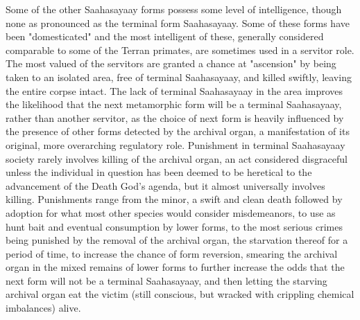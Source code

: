 Some of the other Saahasayaay forms possess some level of
intelligence, though none as pronounced as the terminal form
Saahasayaay. Some of these forms have been "domesticated" and the most
intelligent of these, generally considered comparable to some of the
Terran primates, are sometimes used in a servitor role. The most
valued of the servitors are granted a chance at "ascension" by being
taken to an isolated area, free of terminal Saahasayaay, and killed
swiftly, leaving the entire corpse intact. The lack of terminal
Saahasayaay in the area improves the likelihood that the next
metamorphic form will be a terminal Saahasayaay, rather than another
servitor, as the choice of next form is heavily influenced by the
presence of other forms detected by the archival organ, a
manifestation of its original, more overarching regulatory
role. Punishment in terminal Saahasayaay society rarely involves
killing of the archival organ, an act considered disgraceful unless
the individual in question has been deemed to be heretical to the
advancement of the Death God's agenda, but it almost universally
involves killing. Punishments range from the minor, a swift and clean
death followed by adoption for what most other species would consider
misdemeanors, to use as hunt bait and eventual consumption by lower
forms, to the most serious crimes being punished by the removal of the
archival organ, the starvation thereof for a period of time, to
increase the chance of form reversion, smearing the archival organ in
the mixed remains of lower forms to further increase the odds that the
next form will not be a terminal Saahasayaay, and then letting the
starving archival organ eat the victim (still conscious, but wracked
with crippling chemical imbalances) alive.

